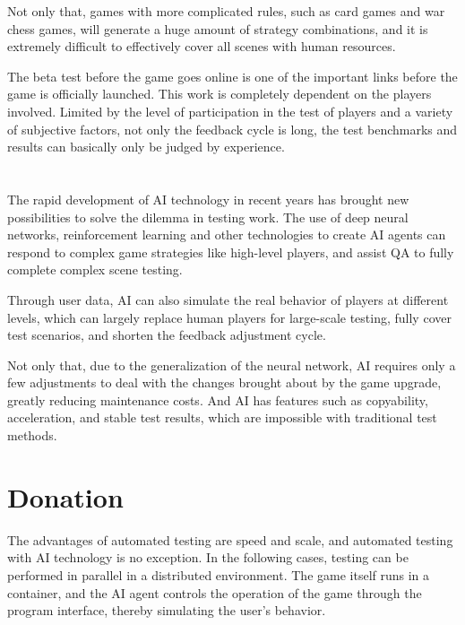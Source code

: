 \documentclass[11pt,en,authoryear]{elegantpaper}
\begin{document}
Not only that, games with more complicated rules, such as card games and war chess games, will generate a huge amount of strategy combinations, and it is extremely difficult to effectively cover all scenes with human resources.

The beta test before the game goes online is one of the important links before the game is officially launched. This work is completely dependent on the players involved. Limited by the level of participation in the test of players and a variety of subjective factors, not only the feedback cycle is long, the test benchmarks and results can basically only be judged by experience.


\section{}
The rapid development of AI technology in recent years has brought new possibilities to solve the dilemma in testing work. The use of deep neural networks, reinforcement learning and other technologies to create AI agents can respond to complex game strategies like high-level players, and assist QA to fully complete complex scene testing.

Through user data, AI can also simulate the real behavior of players at different levels, which can largely replace human players for large-scale testing, fully cover test scenarios, and shorten the feedback adjustment cycle.

Not only that, due to the generalization of the neural network, AI requires only a few adjustments to deal with the changes brought about by the game upgrade, greatly reducing maintenance costs. And AI has features such as copyability, acceleration, and stable test results, which are impossible with traditional test methods.

\section{Donation}
The advantages of automated testing are speed and scale, and automated testing with AI technology is no exception. In the following cases, testing can be performed in parallel in a distributed environment. The game itself runs in a container, and the AI ​​agent controls the operation of the game through the program interface, thereby simulating the user's behavior.


\end{document}
